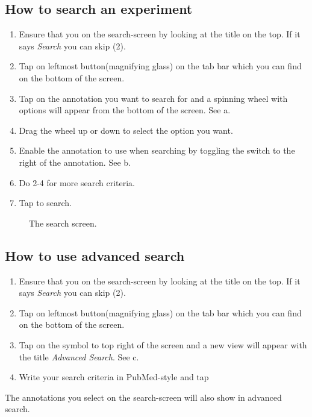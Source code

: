 \subsection{How to search an experiment}

\begin{enumerate}
\item Ensure that you on the search-screen by looking at the title on the top. If it says \emph{Search} you can skip (2). 
\item Tap on leftmost button(magnifying glass) on the tab bar which you can find on the bottom of the screen.
\item Tap on the annotation you want to search for and a spinning wheel with options will appear from the bottom of the screen. See a.
\item Drag the wheel up or down to select the option you want.
\item Enable the annotation to use when searching by toggling the switch to the right of the annotation. See b.
\item Do 2-4 for more search criteria.
\item Tap  to search.
\end{enumerate}

\begin{figure}[ht]
\caption{The search screen.}
\label{fig:ios_search}
\end{figure}
\FloatBarrier

\subsection{How to use advanced search}

\begin{enumerate}
\item Ensure that you on the search-screen by looking at the title on the top. If it says \emph{Search} you can skip (2). 
\item Tap on leftmost button(magnifying glass) on the tab bar which you can find on the bottom of the screen.
\item Tap on the symbol to top right of the screen and a new view will appear with the title \emph{Advanced Search}. See c.
\item Write your search criteria in PubMed-style and tap 
\end{enumerate}
The annotations you select on the search-screen will also show in advanced search.

